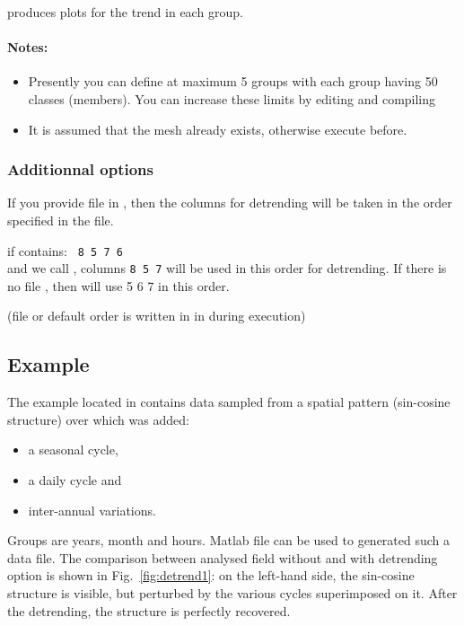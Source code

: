  produces plots for the trend in each group.


\paragraph{Notes:} 
\begin{itemize}
\item Presently you can define at maximum 5 groups with each group having 50 classes (members). You can increase these limits by editing and compiling 
\item It is assumed that the mesh already exists, otherwise execute  before.
\end{itemize}

\subsubsection{Additionnal options}

If you provide file  in , then the columns for detrending will be taken in the order 
specified in the file. 

\example if  contains:
\texttt{
8 5 7 6
}\\
and we call , columns \texttt{8 5 7} will be used in this order for detrending. If there is no file , then  will use 5 6 7 in this order.

(file  or default order is written in  in  during execution)




\subsection{Example}

The example located in  contains data sampled from a spatial pattern (sin-cosine structure) over which was added: 
\begin{itemize}
\item a seasonal cycle, 
\item a daily cycle and 
\item inter-annual variations.
\end{itemize}

Groups are years, month and hours. Matlab file  can be used to generated such a data file. The comparison between analysed field without and with detrending option is shown in Fig.~\ref{fig:detrend1}: on the left-hand side, the sin-cosine structure is visible, but perturbed by the various cycles superimposed on it. After the detrending, the structure is perfectly recovered.

